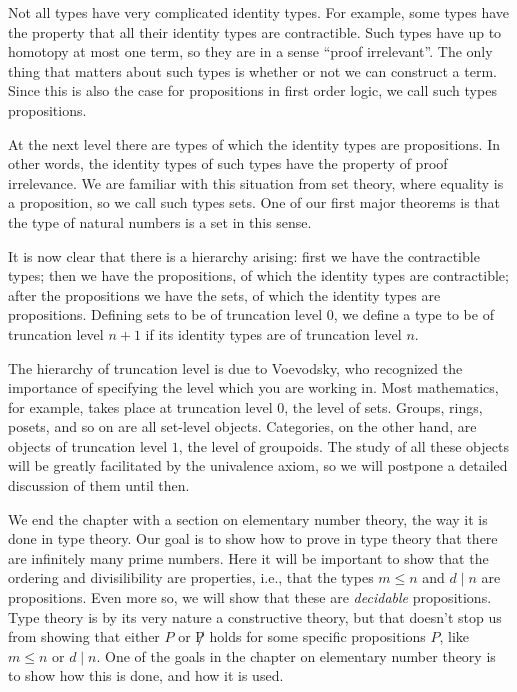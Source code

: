 \documentclass[10pt]{memoir}
\begin{document}
Not all types have very complicated identity types. For example, some types have the property that all their identity types are contractible. Such types have up to homotopy at most one term, so they are in a sense ``proof irrelevant''. The only thing that matters about such types is whether or not we can construct a term. Since this is also the case for propositions in first order logic, we call such types propositions.

At the next level there are types of which the identity types are propositions. In other words, the identity types of such types have the property of proof irrelevance. We are familiar with this situation from set theory, where equality is a proposition, so we call such types sets. One of our first major theorems is that the type of natural numbers is a set in this sense.

It is now clear that there is a hierarchy arising: first we have the contractible types; then we have the propositions, of which the identity types are contractible; after the propositions we have the sets, of which the identity types are propositions. Defining sets to be of truncation level $0$, we define a type to be of truncation level $n+1$ if its identity types are of truncation level $n$.

The hierarchy of truncation level is due to Voevodsky, who recognized the importance of specifying the level which you are working in. Most mathematics, for example, takes place at truncation level $0$, the level of sets. Groups, rings, posets, and so on are all set-level objects. Categories, on the other hand, are objects of truncation level $1$, the level of groupoids. The study of all these objects will be greatly facilitated by the univalence axiom, so we will postpone a detailed discussion of them until then.

We end the chapter with a section on elementary number theory, the way it is done in type theory. Our goal is to show how to prove in type theory that there are infinitely many prime numbers. Here it will be important to show that the ordering and divisilibility are properties, i.e., that the types $m\leq n$ and $d\mid n$ are propositions. Even more so, we will show that these are \emph{decidable} propositions. Type theory is by its very nature a constructive theory, but that doesn't stop us from showing that either $P$ or $\not P$ holds for some specific propositions $P$, like $m\leq n$ or $d\mid n$. One of the goals in the chapter on elementary number theory is to show how this is done, and how it is used.
\end{document}
